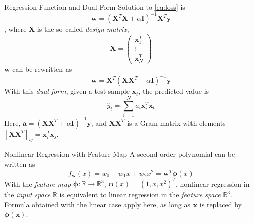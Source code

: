 \documentclass[aspectratio=169]{beamer}
\begin{document}
\begin{frame}{Regression Function and Dual Form}
\scriptsize
Solution to \ref{eq:loss} is
\begin{equation}
\mathbf{w}=(\mathbf{X}^T\mathbf{X}+\alpha\mathbf{I})^{-1}\mathbf{X}^T\mathbf{y}
\end{equation}
, where $\mathbf{X}$ is the so called \emph{design matrix}, 
\begin{equation}
  \mathbf{X}=\begin{pmatrix}\mathbf{x}_1^T \\ \vdots \\ \mathbf{x}_N^T \end{pmatrix}
\end{equation}
$\mathbf{w}$ can be rewritten as
\begin{equation}
\mathbf{w}=\mathbf{X}^T(\mathbf{X}\mathbf{X}^T+\alpha\mathbf{I})^{-1}\mathbf{y}
\end{equation}
With this \emph{dual form}, given a test sample $\mathbf{x}_t$, the predicted value is
\begin{equation} \label{eq:sol}
\hat{y}_t=\sum_{i=1}^{N}a_i\mathbf{x}_i^T\mathbf{x}_t
\end{equation}
Here, $\mathbf{a}=(\mathbf{X}\mathbf{X}^T+\alpha\mathbf{I})^{-1}\mathbf{y}$, and $\mathbf{X}\mathbf{X}^T$ is a Gram matrix with elements $[\mathbf{X}\mathbf{X}^T]_{ij}=\mathbf{x}_i^T\mathbf{x}_j$.
\end{frame}

\begin{frame}{Nonlinear Regression with Feature Map}
A second order polynomial can be written as
\begin{equation}
f_\mathbf{w}(x)=w_0+w_1x+w_2x^2=\mathbf{w}^T\bm{\phi}(x)
\end{equation}
With the \emph{feature map} $\bm{\phi}:\mathbb{R}\rightarrow\mathbb{R}^3$, $\bm{\phi}(x)=(1,x,x^2)^T$, nonlinear regression in the \emph{input space} $\mathbb{R}$ is equivalent to linear regression in the \emph{feature space} $\mathbb{R}^3$. \\
Formula obtained with the linear case apply here, as long as $\mathbf{x}$ is replaced by $\bm{\phi}(\mathbf{x})$.
\end{frame}
\end{document}

